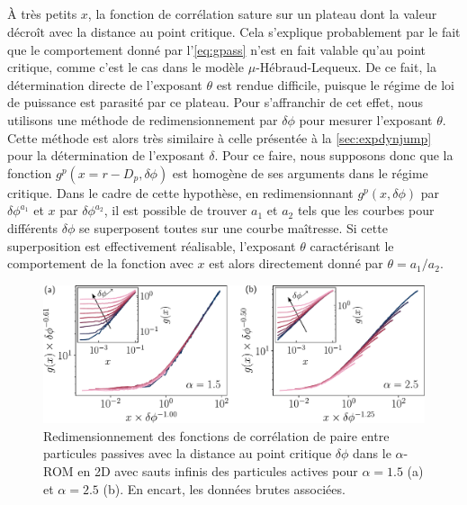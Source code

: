 \subparagraph{}\`A très petits $x$, la fonction de corrélation sature sur un plateau dont la valeur décroît avec la distance au point critique. Cela s'explique probablement par le fait que le comportement donné par l'\autoref{eq:gpass} n'est en fait valable qu'au point critique, comme c'est le cas dans le modèle $\mu$-Hébraud-Lequeux. De ce fait, la détermination directe de l'exposant $\theta$ est rendue difficile, puisque le régime de loi de puissance est parasité par ce plateau. Pour s'affranchir de cet effet, nous utilisons une méthode de redimensionnement par $\delta\phi$ pour mesurer l'exposant $\theta$. Cette méthode est alors très similaire à celle présentée à la \autoref{sec:expdynjump} pour la détermination de l'exposant $\delta$. Pour ce faire, nous supposons donc que la fonction $g^p(x=r-D_p, \delta\phi)$ est homogène de ses arguments dans le régime critique. Dans le cadre de cette hypothèse, en redimensionnant $g^p(x, \delta\phi)$ par $\delta\phi^{a_1}$ et $x$ par $\delta\phi^{a_2}$, il est possible de trouver $a_1$ et $a_2$ tels que les courbes pour différents $\delta\phi$ se superposent toutes sur une courbe maîtresse. Si cette superposition est effectivement réalisable, l'exposant $\theta$ caractérisant le comportement de la fonction avec $x$ est alors directement donné par $\theta = a_1/a_2$.

\begin{figure}[h]
	\centering
	\includegraphics[width=\textwidth]{Chapitre3/Figures/Interpretation/PCorr_alphaMF.pdf}
	\caption{Redimensionnement des fonctions de corrélation de paire entre particules passives avec la distance au point critique $\delta\phi$ dans le $\alpha$-ROM en 2D avec sauts infinis des particules actives pour $\alpha = 1.5$ (a) et $\alpha=2.5$ (b). En encart, les données brutes associées.}
	\label{fig:PCorr_alphaMF}
\end{figure}

